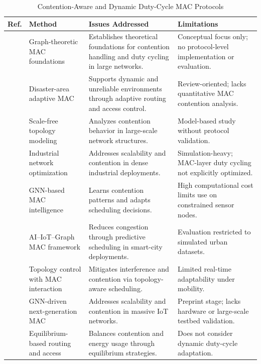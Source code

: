 \documentclass[a4paper,fleqn]{cas-dc}
\numberwithin{equation}{section}
\begin{document}
\begin{table}[width=.9\textwidth,cols=4,pos=h]
\caption{Contention-Aware and Dynamic Duty-Cycle MAC Protocols}
\label{table:mac_design_r21_r30}
\begin{tabular*}{\textwidth}{@{\extracolsep{\fill}} p{} p{} p{} p{}}
\toprule
\textbf{Ref.} & \textbf{Method} & \textbf{Issues Addressed} & \textbf{Limitations} \\
\midrule

\cite{r21} & Graph-theoretic MAC foundations &
Establishes theoretical foundations for contention handling and duty cycling in large networks. &
Conceptual focus only; no protocol-level implementation or evaluation. \\
\addlinespace

\cite{r22} & Disaster-area adaptive MAC &
Supports dynamic and unreliable environments through adaptive routing and access control. &
Review-oriented; lacks quantitative MAC contention analysis. \\
\addlinespace

\cite{r23} & Scale-free topology modeling &
Analyzes contention behavior in large-scale network structures. &
Model-based study without protocol validation. \\
\addlinespace

\cite{r26} & Industrial network optimization &
Addresses scalability and contention in dense industrial deployments. &
Simulation-heavy; MAC-layer duty cycling not explicitly optimized. \\
\addlinespace

\cite{r27} & GNN-based MAC intelligence &
Learns contention patterns and adapts scheduling decisions. &
High computational cost limits use on constrained sensor nodes. \\
\addlinespace

\cite{r28} & AI--IoT--Graph MAC framework &
Reduces congestion through predictive scheduling in smart-city deployments. &
Evaluation restricted to simulated urban datasets. \\
\addlinespace

\cite{r29} & Topology control with MAC interaction &
Mitigates interference and contention via topology-aware scheduling. &
Limited real-time adaptability under mobility. \\
\addlinespace

\cite{r30} & GNN-driven next-generation MAC &
Addresses scalability and contention in massive IoT networks. &
Preprint stage; lacks hardware or large-scale testbed validation. \\
\addlinespace

\cite{sensors2018} & Equilibrium-based routing and access &
Balances contention and energy usage through equilibrium strategies. &
Does not consider dynamic duty-cycle adaptation. \\

\bottomrule
\end{tabular*}
\end{table}
\end{document}

